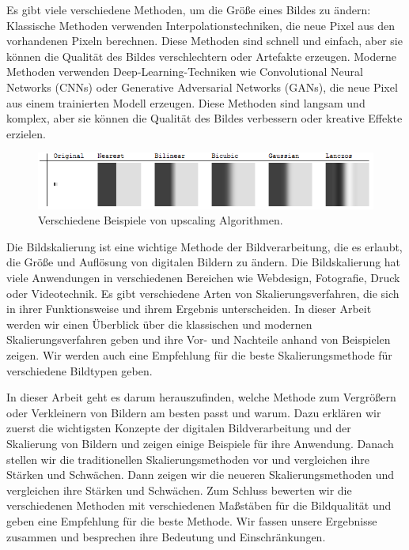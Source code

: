 Es gibt viele verschiedene Methoden, um die Größe eines Bildes zu ändern: Klassische Methoden verwenden Interpolationstechniken, die neue Pixel aus den vorhandenen Pixeln berechnen. Diese Methoden sind schnell und einfach, aber sie können die Qualität des Bildes verschlechtern oder Artefakte erzeugen. Moderne Methoden verwenden Deep-Learning-Techniken wie Convolutional Neural Networks (CNNs) oder Generative Adversarial Networks (GANs), die neue Pixel aus einem trainierten Modell erzeugen. Diese Methoden sind langsam und komplex, aber sie können die Qualität des Bildes verbessern oder kreative Effekte erzielen.

\begin{figure}[h]
    \vspace{8mm}
    \centering
    \includegraphics{img/xaR8r.png}
    \caption{Verschiedene Beispiele von upscaling Algorithmen\cite{whuber.lanczos}.}
    \label{fig:my_label}
    \vspace{4mm}
\end{figure}

Die Bildskalierung ist eine wichtige Methode der Bildverarbeitung, die es erlaubt, die Größe und Auflösung von digitalen Bildern zu ändern. Die Bildskalierung hat viele Anwendungen in verschiedenen Bereichen wie Webdesign, Fotografie, Druck oder Videotechnik. Es gibt verschiedene Arten von Skalierungsverfahren, die sich in ihrer Funktionsweise und ihrem Ergebnis unterscheiden. In dieser Arbeit werden wir einen Überblick über die klassischen und modernen Skalierungsverfahren geben und ihre Vor- und Nachteile anhand von Beispielen zeigen. Wir werden auch eine Empfehlung für die beste Skalierungsmethode für verschiedene Bildtypen geben.

In dieser Arbeit geht es darum herauszufinden, welche Methode zum Vergrößern oder Verkleinern von Bildern am besten passt und warum. Dazu erklären wir zuerst die wichtigsten Konzepte der digitalen Bildverarbeitung und der Skalierung von Bildern und zeigen einige Beispiele für ihre Anwendung. Danach stellen wir die traditionellen Skalierungsmethoden vor und vergleichen ihre Stärken und Schwächen. Dann zeigen wir die neueren Skalierungsmethoden und vergleichen ihre Stärken und Schwächen. Zum Schluss bewerten wir die verschiedenen Methoden mit verschiedenen Maßstäben für die Bildqualität und geben eine Empfehlung für die beste Methode. Wir fassen unsere Ergebnisse zusammen und besprechen ihre Bedeutung und Einschränkungen.
